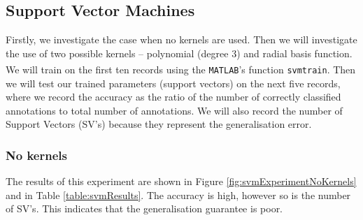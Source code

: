 \subsection{Support Vector Machines}
Firstly, we investigate the case when no kernels are used. Then we will investigate the use of two possible kernels -- polynomial (degree 3) and radial basis function. We will train on the first ten records using the \verb!MATLAB!\textsuperscript{\textregistered}'s function \verb!svmtrain!. Then we will test our trained parameters (support vectors) on the next five records, where we record the accuracy as the ratio of the number of correctly classified annotations to total number of annotations. We will also record the number of Support Vectors (SV's) because they represent the generalisation error.

\subsubsection{No kernels}
The results of this experiment are shown in Figure \ref{fig:svmExperimentNoKernels} and in Table \ref{table:svmResults}. The accuracy is high, however so is the number of SV's. This indicates that the generalisation guarantee is poor.
